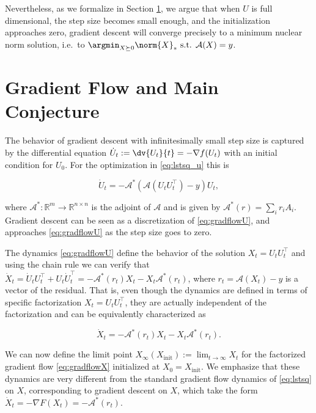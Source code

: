 Nevertheless, as we formalize in Section \ref{sec:gf}, we argue that when $U$ is full dimensional, the step size becomes small enough, and the initialization approaches zero, gradient descent will converge precisely to a minimum nuclear norm solution, i.e.~to
$\argmin_{X\succeq0} \norm{X}_*\text{ s.t. } \mathcal{A}(X)=y$.

\section{Gradient Flow and Main Conjecture} \label{sec:gf}

The behavior of gradient descent with infinitesimally small step size is captured by the differential equation $\dot{U}_t := \dv{U_t}{t} =
-\nabla f(U_t)$ with an initial condition for $U_0$.  For the optimization in 
\eqref{eq:lstsq_u} this is

\begin{equation} \label{eq:gradflowU}
\dot{U}_t = -\mathcal{A}^*(\mathcal{A}(U_tU_t^\top)-y)U_t,
\end{equation}

where $\mathcal{A}^*:\mathbb{R}^m\to\mathbb{R}^{n\times n}$ is the adjoint of $\mathcal{A}$
and is given by $\mathcal{A}^*(r)=\sum_ir_iA_i$. Gradient descent can be seen as a discretization of \eqref{eq:gradflowU}, and approaches
\eqref{eq:gradflowU} as the step size goes to zero.

The dynamics \eqref{eq:gradflowU} define the behavior of the solution $X_t=U_t U_t^\top$ and using the chain rule we can verify that
$\dot{X}_t = \dot{U}_tU_t^\top + U_t\dot{U}_t^\top =
-\mathcal{A}^*(r_t)X_t - X_t\mathcal{A}^*(r_t)$, where $r_t =
\mathcal{A}(X_t)-y$ is a vector of  the residual.  That is, even though the dynamics are defined in terms of specific factorization $X_t=U_t U_t^\top$,
they are actually independent of the factorization and can be equivalently characterized as

\begin{equation} \label{eq:gradflowX}
\dot{X}_t = -\mathcal{A}^*(r_t)X_t - X_t\mathcal{A}^*(r_t).
\end{equation}

We can now define the limit point  $X_\infty(X_{\textrm{init}}) := \lim_{t\to\infty}
X_t$ for the factorized gradient flow  \eqref{eq:gradflowX} initialized at $X_0=X_{\textrm{init}}$.  We emphasize that these dynamics are very different from the standard gradient flow dynamics of \eqref{eq:lstsq} on $X$, corresponding to gradient descent on $X$, which take the form $\dot{X}_t = -\nabla F(X_t) =
-\mathcal{A}^*(r_t)$. 

